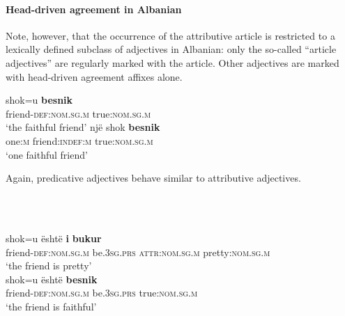 \paragraph*{Head\hyp{}driven agreement in Albanian}
Note, however, that the occurrence of the attributive article is restricted to a lexically defined subclass of adjectives in Albanian: only the so-called “article adjectives” are regularly marked with the article. Other adjectives are marked with head\hyp{}driven agreement affixes alone.
\begin{exe}
\begin{xlist}
\ex
\gll	shok=u					\textbf{besnik}\\
	friend-\textsc{def:nom.sg.m} 	true:\textsc{nom.sg.m}\\
\glt	‘the faithful friend’
\ex
\gll 	një			shok					\textbf{besnik}\\
	one:\textsc{m}	friend:\textsc{indef:m} 	true:\textsc{nom.sg.m}\\
\glt	‘one faithful friend’
\end{xlist}
\end{exe}
Again, predicative adjectives behave similar to attributive adjectives.
\begin{exe}
\\
\begin{xlist}
\\
\gll	shok=u është \textbf{i} \textbf{bukur}\\
	friend-\textsc{def:nom.sg.m} be\textsc{.3sg.prs} \textsc{attr:nom.sg.m} pretty:\textsc{nom.sg.m}\\
\glt	‘the friend is pretty’
\\
\gll	shok=u është \textbf{besnik}\\
	friend-\textsc{def:nom.sg.m} be\textsc{.3sg.prs} true:\textsc{nom.sg.m}\\
\glt	‘the friend is faithful’
\end{xlist}
\end{exe}

